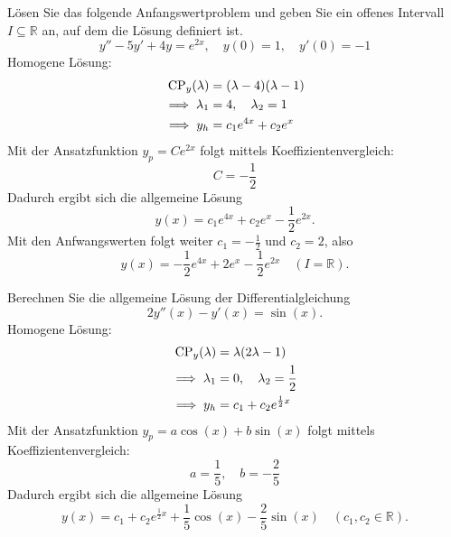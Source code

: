 Lösen Sie das folgende Anfangswertproblem und geben Sie ein offenes Intervall $I \subseteq \mathbb{R}$ an, auf dem die Lösung definiert ist.
\begin{displaymath}
  y'' - 5y' + 4y = e^{2x}, \quad y(0) = 1, \quad y'(0) = -1
\end{displaymath}
Homogene Lösung:
\begin{align*}
  \operatorname{CP}_y(\lambda) &= (\lambda - 4)(\lambda - 1)\\
  \implies \lambda_1 &= 4, \quad \lambda_2 = 1\\
  \implies y_h &= c_1 e^{4x} + c_2 e^{x}
\end{align*}
Mit der Ansatzfunktion $y_p = Ce^{2x}$ folgt mittels Koeffizientenvergleich:
\begin{displaymath}
  C = -\frac{1}{2}
\end{displaymath}
Dadurch ergibt sich die allgemeine Lösung
\begin{displaymath}
  y(x) = c_1 e^{4x} + c_2 e^{x} - \frac{1}{2}e^{2x}.
\end{displaymath}
Mit den Anfwangswerten folgt weiter $c_1 = -\frac{1}{2}$ und $c_2 = 2$, also
\begin{displaymath}
  y(x) = -\frac{1}{2} e^{4x} + 2 e^{x} - \frac{1}{2}e^{2x} \quad (I = \mathbb{R}).
\end{displaymath}

Berechnen Sie die allgemeine Lösung der Differentialgleichung
\begin{displaymath}
  2y''(x) - y'(x) = \sin(x).
\end{displaymath}
Homogene Lösung:
\begin{align*}
  \operatorname{CP}_y(\lambda) &= \lambda(2\lambda - 1)\\
  \implies \lambda_1 &= 0, \quad \lambda_2 = \frac{1}{2}\\
  \implies y_h &= c_1 + c_2 e^{\frac{1}{2} x}
\end{align*}
Mit der Ansatzfunktion $y_p = a \cos(x) + b\sin(x)$ folgt mittels Koeffizientenvergleich:
\begin{displaymath}
  a = \frac{1}{5}, \quad b = -\frac{2}{5}
\end{displaymath}
Dadurch ergibt sich die allgemeine Lösung
\begin{displaymath}
  y(x) = c_1 + c_2 e^{\frac{1}{2} x} + \frac{1}{5}\cos(x) - \frac{2}{5}\sin(x) \quad (c_1, c_2 \in \mathbb{R}).
\end{displaymath}

